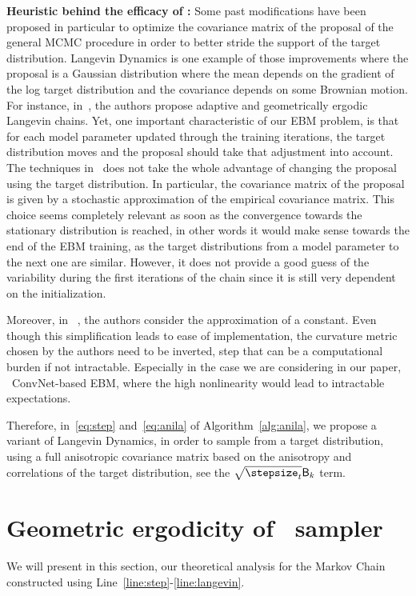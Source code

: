 \documentclass[letterpaper]{article} %
\begin{document}
\textbf{Heuristic behind the efficacy of \algo:}
Some past modifications have been proposed in particular to optimize the covariance matrix of the proposal of the general MCMC procedure in order to better stride the support of the target distribution. 
Langevin Dynamics is one example of those improvements where the proposal is a Gaussian distribution where the mean depends on the gradient of the log target distribution and the covariance depends on some Brownian motion.
For instance, in~\citet{atchade2006adaptive,marshall2012adaptive}, the authors propose adaptive and geometrically ergodic Langevin chains. 
Yet, one important characteristic of our EBM problem, is that for each model parameter updated through the training iterations, the target distribution moves and the proposal should take that adjustment into account.
The techniques in~\citet{atchade2006adaptive,marshall2012adaptive} does not take the whole advantage of changing the proposal using the target distribution. 
In particular, the covariance matrix of the proposal is given by a stochastic approximation of the empirical covariance matrix. 
This choice seems completely relevant as soon as the convergence towards the stationary distribution is reached, in other words it would make sense towards the end of the EBM training, as the target distributions from a model parameter to the next one are similar. 
However, it does not provide a good guess of the variability during the first iterations of the chain since it is still very dependent on the initialization. 

Moreover, in ~\citet{girolami2011riemann}, the authors consider the approximation of a constant. Even though this simplification leads to ease of implementation, the curvature metric chosen by the authors need to be inverted, step that can be a computational burden if not intractable. 
Especially in the case we are considering in our paper, \ie\ ConvNet-based EBM, where the high nonlinearity would lead to intractable expectations.

Therefore, in~\eqref{eq:step} and~\eqref{eq:anila} of Algorithm~\ref{alg:anila}, we propose a variant of Langevin Dynamics, in order to sample from a target distribution, using a full anisotropic covariance matrix based on the anisotropy and correlations of the target distribution, see the $\sqrt{\stepsize_t} \mathsf{B}_k$ term. 


\section{Geometric ergodicity of \algo\ sampler}\label{sec:theory}
We will present in this section, our theoretical analysis for the Markov Chain constructed using Line~\ref{line:step}-\ref{line:langevin}. 
\end{document}
